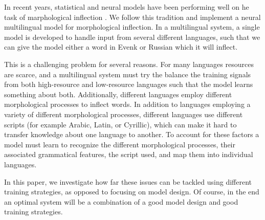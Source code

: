 \documentclass[11pt,a4paper]{article}
\begin{document}
In recent years, statistical and neural models have been performing
well on he task of marphological inflection
\cite{DBLP:conf/eacl/SmitVGK14, kann2016med,
DBLP:conf/conll/MakarovRC17, sharma-etal-2018-iit}. We follow this
tradition and implement a neural multilingual model for morphological
inflection. In a multilingual system, a single model is developed to
handle input from several different languages, such that we can give
the model either a word in Evenk or Russian which it will inflect.





This is a challenging problem for several reasons. For many languages
resources are scarce, and a multilingual system must try the balance
the training signals from both high-resource and low-resource
languages such that the model learns something about both.
Additionally, different languages employ different morphological
processes to inflect words. In addition to languages employing a
variety of different morphological processes, different languages use
different scripts (for example Arabic, Latin, or Cyrillic), which can
make it hard to transfer knowledge about one language to another.  To
account for these factors a model must learn to recognize the
different morphological processes, their associated grammatical
features, the script used, and map them into individual languages.

In this paper, we investigate how far these issues can be tackled
using different training strategies, as opposed to focusing on model
design. Of course, in the end an optimal system will be a
combination of a good model design and good training strategies.

\end{document}
